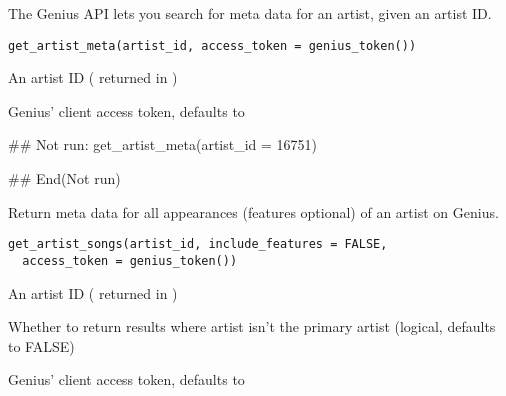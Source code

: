 \documentclass[a4paper]{book}
\begin{document}
%
\begin{Description}\relax
The Genius API lets you search for meta data for an artist, given an artist ID.
\end{Description}
%
\begin{Usage}
\begin{verbatim}
get_artist_meta(artist_id, access_token = genius_token())
\end{verbatim}
\end{Usage}
%
\begin{Arguments}
\begin{ldescription}
\item[\code{artist\_id}] An artist ID ( returned in )

\item[\code{access\_token}] Genius' client access token, defaults to 
\end{ldescription}
\end{Arguments}
%
\begin{Examples}
\begin{ExampleCode}
## Not run: 
get_artist_meta(artist_id = 16751)

## End(Not run)
\end{ExampleCode}
\end{Examples}
%
\begin{Description}\relax
Return meta data for all appearances (features optional) of an artist on Genius.
\end{Description}
%
\begin{Usage}
\begin{verbatim}
get_artist_songs(artist_id, include_features = FALSE,
  access_token = genius_token())
\end{verbatim}
\end{Usage}
%
\begin{Arguments}
\begin{ldescription}
\item[\code{artist\_id}] An artist ID ( returned in )

\item[\code{include\_features}] Whether to return results where artist isn't the primary artist (logical, defaults to FALSE)

\item[\code{access\_token}] Genius' client access token, defaults to 
\end{ldescription}
\end{Arguments}
\end{document}
